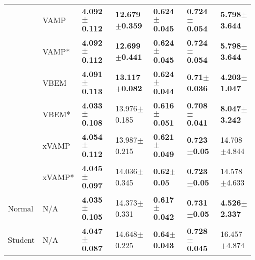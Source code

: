 \begin{tabular}{lllllll}
        & VAMP &  \textbf{4.092$\pm$0.112} &  \textbf{12.679$\pm$0.359} &  \textbf{0.624$\pm$0.045} &  \textbf{0.724$\pm$0.054} &  \textbf{5.798$\pm$3.644} \\
        & VAMP* &  \textbf{4.092$\pm$0.112} &  \textbf{12.699$\pm$0.441} &  \textbf{0.624$\pm$0.045} &  \textbf{0.724$\pm$0.054} &  \textbf{5.798$\pm$3.644} \\
        & VBEM &  \textbf{4.091$\pm$0.113} &  \textbf{13.117$\pm$0.082} &  \textbf{0.624$\pm$0.044} &   \textbf{0.71$\pm$0.036} &  \textbf{4.203$\pm$1.047} \\
        & VBEM* &  \textbf{4.033$\pm$0.108} &           13.976$\pm$0.185 &  \textbf{0.616$\pm$0.051} &  \textbf{0.708$\pm$0.041} &  \textbf{8.047$\pm$3.242} \\
        & xVAMP &  \textbf{4.054$\pm$0.112} &           13.987$\pm$0.215 &  \textbf{0.621$\pm$0.049} &   \textbf{0.723$\pm$0.05} &          14.708$\pm$4.844 \\
        & xVAMP* &  \textbf{4.045$\pm$0.097} &           14.036$\pm$0.345 &    \textbf{0.62$\pm$0.05} &   \textbf{0.723$\pm$0.05} &          14.578$\pm$4.633 \\
Normal & N/A &  \textbf{4.035$\pm$0.105} &           14.373$\pm$0.331 &  \textbf{0.617$\pm$0.042} &   \textbf{0.731$\pm$0.05} &  \textbf{4.526$\pm$2.337} \\
Student & N/A &  \textbf{4.047$\pm$0.087} &           14.648$\pm$0.225 &   \textbf{0.64$\pm$0.043} &  \textbf{0.728$\pm$0.045} &          16.457$\pm$4.874 \\
\bottomrule
\end{tabular}

